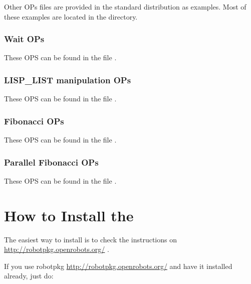 Other OPs files are provided in the standard distribution as examples. Most of
these examples are located in the  directory.



\subsection{Wait OPs}

These OPS can be found in the file .



\subsection{LISP\_LIST manipulation OPs}

These OPS can be found in the file .



\subsection{Fibonacci OPs}

These OPS can be found in the file .



\subsection{Parallel Fibonacci OPs}

These OPS can be found in the file .



\chapter{How to Install the \COPRSDE{}}

The easiest way to install \COPRSDE{} is to check the instructions on \url{http://robotpkg.openrobots.org/} .

If you use robotpkg \url{http://robotpkg.openrobots.org/} and have it installed already, just do:

